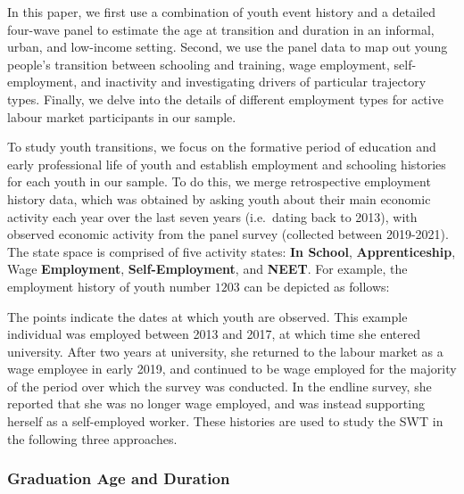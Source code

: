 \documentclass[
  a4paper, twoside, 12pt]{book}
\begin{document}
In this paper, we first use a combination of youth event history and a detailed four-wave panel to estimate the age at transition and duration in an informal, urban, and low-income setting. Second, we use the panel data to map out young people's transition between schooling and training, wage employment, self-employment, and inactivity and investigating drivers of particular trajectory types. Finally, we delve into the details of different employment types for active labour market participants in our sample.

To study youth transitions, we focus on the formative period of education and early professional life of youth and establish employment and schooling histories for each youth in our sample. To do this, we merge retrospective employment history data, which was obtained by asking youth about their main economic activity each year over the last seven years (i.e.~dating back to 2013), with observed economic activity from the panel survey (collected between 2019-2021). The state space is comprised of five activity states: \textbf{In School}, \textbf{Apprenticeship}, Wage \textbf{Employment}, \textbf{Self-Employment}, and \textbf{NEET}. For example, the employment history of youth number \(1203\) can be depicted as follows:

\begin{figure}[H]
\centering
{}
\end{figure}

The points indicate the dates at which youth are observed. This example individual was employed between 2013 and 2017, at which time she entered university. After two years at university, she returned to the labour market as a wage employee in early 2019, and continued to be wage employed for the majority of the period over which the survey was conducted. In the endline survey, she reported that she was no longer wage employed, and was instead supporting herself as a self-employed worker. These histories are used to study the SWT in the following three approaches.

\hypertarget{onset}{%
\subsubsection*{Graduation Age and Duration}\label{onset}}
\end{document}
